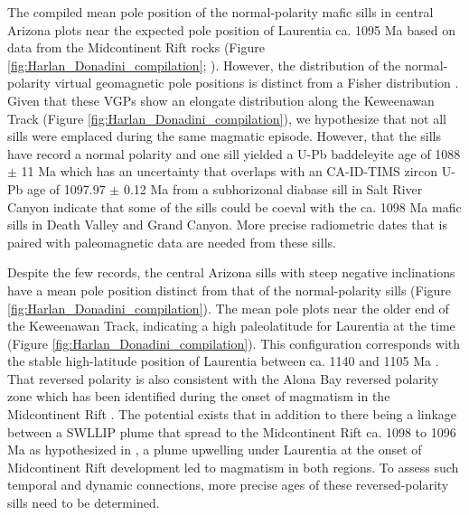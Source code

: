\documentclass[draft]{agujournal2019}
\begin{document}
The compiled mean pole position of the normal-polarity mafic sills in central Arizona plots near the expected pole position of Laurentia ca. 1095 Ma based on data from the Midcontinent Rift rocks (Figure \ref{fig:Harlan_Donadini_compilation}; ). However, the distribution of the normal-polarity virtual geomagnetic pole positions is distinct from a Fisher distribution \cite{Fisher1953a}. Given that these VGPs show an elongate distribution along the Keweenawan Track (Figure \ref{fig:Harlan_Donadini_compilation}), we hypothesize that not all sills were emplaced during the same magmatic episode. However, that the sills have record a normal polarity and one sill yielded a U-Pb baddeleyite age of 1088 $\pm$ 11 Ma \cite{Bright2014a} which has an uncertainty that overlaps with an CA-ID-TIMS zircon U-Pb age of 1097.97 $\pm$ 0.12 Ma from a subhorizonal diabase sill in Salt River Canyon \cite{Mohr2024a} indicate that some of the sills could be coeval with the ca. 1098 Ma mafic sills in Death Valley and Grand Canyon. More precise radiometric dates that is paired with paleomagnetic data are needed from these sills. 

Despite the few records, the central Arizona sills with steep negative inclinations have a mean pole position distinct from that of the normal-polarity sills (Figure \ref{fig:Harlan_Donadini_compilation}). The mean pole plots near the older end of the Keweenawan Track, indicating a high paleolatitude for Laurentia at the time (Figure \ref{fig:Harlan_Donadini_compilation}). This configuration corresponds with the stable high-latitude position of Laurentia between ca. 1140 and 1105 Ma \cite{Ernst1993a, Piispa2018a, Swanson-Hysell2021c}. That reversed polarity is also consistent with the Alona Bay reversed polarity zone which has been identified during the onset of magmatism in the Midcontinent Rift \cite{Swanson-Hysell2019a}. The potential exists that in addition to there being a linkage between a SWLLIP plume that spread to the Midcontinent Rift ca. 1098 to 1096 Ma as hypothesized in , a plume upwelling under Laurentia at the onset of Midcontinent Rift development led to magmatism in both regions. To assess such temporal and dynamic connections, more precise ages of these reversed-polarity sills need to be determined. 
\end{document}
